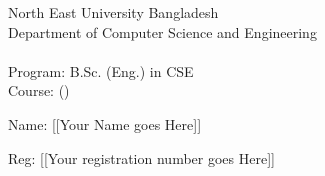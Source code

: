 \vspace{5cm}    

\begin{center}
    \LARGE North East University Bangladesh
    \\Department of Computer Science and Engineering
    \\ \examName
    \\Program: B.Sc. (Eng.) in CSE
    \\Course: \courseCode(\courseTitle)
\end{center}

\vspace{5cm}    
\LARGE{
Name: [[Your Name goes Here]]

Reg: [[Your registration number goes Here]]
}
